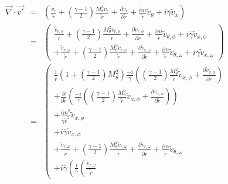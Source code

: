 \begin{eqnarray}
\vec{\nabla} \cdot \vec{v'} &=&
\left(
\frac{ \widetilde{v}_r}{\widetilde{r}}
+
\left(
\frac{\gamma-1}{2}
\right)
\frac{
M_{\theta}^2
 \widetilde{v}_r
}{\widetilde{r}}
+ \frac{\partial \widetilde{v}_r}{\partial \widetilde{r}}
+ \frac{i m}{\widetilde{r}} \widetilde{v}_{\theta}
+ i \overline{\gamma} \widetilde{v}_x
\right)
\nonumber
\\
&=&
\left(
\begin{array}{r}
\frac{ \widetilde{v}_{r,\phi}}{\widetilde{r}}
+
\left(
\frac{\gamma-1}{2}
\right)
\frac{
M_{\theta}^2
 \widetilde{v}_{r,\phi}
}{\widetilde{r}}
+ \frac{\partial \widetilde{v}_{r,\phi}}{\partial \widetilde{r}}
+ \frac{i m}{\widetilde{r}} \widetilde{v}_{\theta,\phi}
+ i \overline{\gamma} \widetilde{v}_{x,\phi}
\\
+\frac{ \widetilde{v}_{r,\omega}}{\widetilde{r}}
+
\left(
\frac{\gamma-1}{2}
\right)
\frac{
M_{\theta}^2
 \widetilde{v}_{r,\omega}
}{\widetilde{r}}
+ \frac{\partial \widetilde{v}_{r,\omega}}{\partial \widetilde{r}}
+ \frac{i m}{\widetilde{r}} \widetilde{v}_{\theta,\omega}
+ i \overline{\gamma} \widetilde{v}_{x,\omega}
\end{array}
\right)
\nonumber
\\
&=&
\left(
\begin{array}{r}
\frac{1}{\widetilde{r}}
\left(
1
+
\left(
\frac{\gamma-1}{2}
\right)
M_{\theta}^2
\right)
\frac{-i}{ \overline{\gamma}}
\left(
\left(\frac{\gamma-1}{2} \right)
\frac{M_{\theta}^2}{\widetilde{r}}
\widetilde{v}_{x,\phi}
+
\frac{\partial \widetilde{v}_{x,\phi}}{\partial \widetilde{r}} 
\right)
\\
+ \frac{\partial }{\partial \widetilde{r}}
\left(
\frac{-i}{ \overline{\gamma}}
\left(
\left(\frac{\gamma-1}{2} \right)
\frac{M_{\theta}^2}{\widetilde{r}}
\widetilde{v}_{x,\phi}
+
\frac{\partial \widetilde{v}_{x,\phi}}{\partial \widetilde{r}} 
\right)
\right)
\\
+ \frac{i m^2}
{\overline{\gamma} \widetilde{r}^2} \widetilde{v}_{x,\phi}
\\
+ i \overline{\gamma} \widetilde{v}_{x,\phi}
\\
+\frac{ \widetilde{v}_{r,\omega}}{\widetilde{r}}
+
\left(
\frac{\gamma-1}{2}
\right)
\frac{
M_{\theta}^2
 \widetilde{v}_{r,\omega}
}{\widetilde{r}}
+ \frac{\partial \widetilde{v}_{r,\omega}}{\partial \widetilde{r}}
+ \frac{i m}{\widetilde{r}} \widetilde{v}_{\theta,\omega}
\\
+ i \overline{\gamma} 
\left(
\frac{i}{\overline{\gamma}}
\left(
\frac{ \widetilde{v}_{r,\omega}}{\widetilde{r}}

\end{array}
\end{eqnarray}
